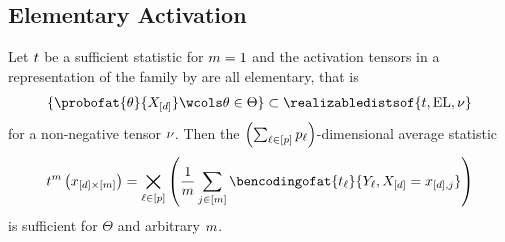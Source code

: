 \documentclass[aps,onecolumn,nofootinbib,pra]{article}
\begin{document}
    \subsection{Elementary Activation}

    \begin{theorem}
        Let $t$ be a sufficient statistic for $m=1$ and the activation tensors in a representation of the family by \ComputationActivationNetworks{} are all elementary, that is
        \begin{align*}
            \{\probofat{\theta}{\shortcatvariables}\wcols\theta\in\Theta\} \subset \realizabledistsof{\sstat,\elgraph,\basemeasure}
        \end{align*}
        for a non-negative tensor $\nu$.
        Then the $\left(\sum_{\ell\in[p]}p_{\ell}\right)$-dimensional average statistic
        \begin{align*}
            \sstat^{\datanum}\left(\catindexof{[\catorder]\times[\datanum]}\right) =
            \bigtimes_{\selindexin} \left(\frac{1}{\datanum}\sum_{\datindexin} \bencodingofat{\sstatcoordinateof{\selindex}}{\headvariableof{\selindex},\shortcatvariables=\catindexof{[\catorder],\datindex}}\right)
        \end{align*}
        is sufficient for $\Theta$ and arbitrary $m$.
    \end{theorem}
\end{document}
